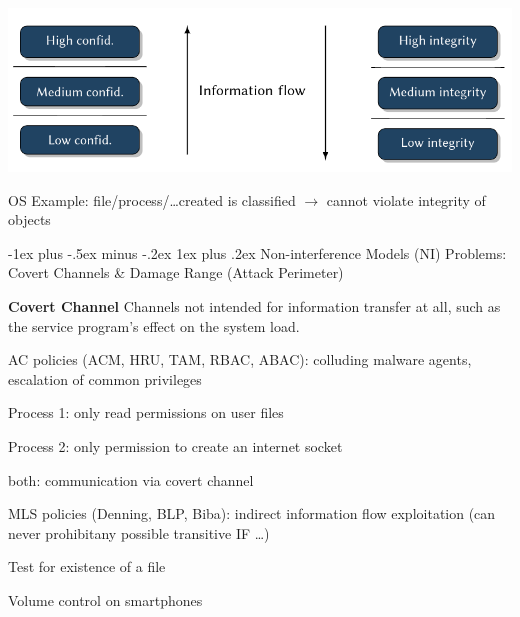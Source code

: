\documentclass[a4paper]{article}
\makeatletter
\renewcommand{\note}[2]{\begin{noteBox} \textbf{#1} #2 \end{noteBox}}
\renewcommand{\subsubsection}{\@startsection{subsubsection}{3}{0mm}%
                {-1ex plus -.5ex minus -.2ex}%
                {1ex plus .2ex}%
                {\normalfont\small\bfseries}}
\makeatother
\begin{document}
\begin{multicols}{3}
\begin{multicols}{2}
        \begin{center}
            \includegraphics[width=\linewidth]{Assets/Systemsicherheit-blp-vs-biba.png}
        \end{center}
    \end{multicols}

    OS Example: file/process/\dots created is classified $\rightarrow$ cannot violate integrity of objects

    \subsubsection{Non-interference Models (NI)}
    Problems: Covert Channels \& Damage Range (Attack Perimeter)

    \note{Covert Channel}{Channels not intended for information transfer at all, such as the service program’s effect on the system load.}

    \begin{itemize*}
        \item AC policies (ACM, HRU, TAM, RBAC, ABAC): colluding malware agents, escalation of common privileges
        \begin{itemize*}
            \item Process 1: only read permissions on user files
            \item Process 2: only permission to create an internet socket
            \item both: communication via covert channel
        \end{itemize*}
        \item MLS policies (Denning, BLP, Biba): indirect information flow exploitation (can never prohibitany possible transitive IF \dots )
        \begin{itemize*}
            \item Test for existence of a file
            \item Volume control on smartphones
        \end{itemize*}
    \end{itemize*}


\end{multicols}
\end{document}
